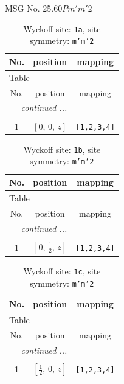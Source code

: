 \documentclass[fleqn,8pt]{jsarticle}
\begin{document}
\setcounter{MaxMatrixCols}{32}

\renewcommand{\tablename}{Table~}
\renewcommand{\figurename}{Figure~}
\begin{center}
\LARGE
MSG No. 25.60\quad$Pm'm'2$
\end{center}
\renewcommand{\arraystretch}{1.2}
\begin{longtable}{ccc}
\caption{Wyckoff site: {\tt 1a}, site symmetry: {\tt m'm'2}}
 \\
 \hline \hline
No. & position & mapping \\ \hline \endfirsthead

\multicolumn{2}{l}{\tablename\ \thetable{}} \\
 \hline \hline
No. & position & mapping \\ \hline \endhead

 \hline \hline
\multicolumn{2}{r}{\footnotesize\it continued ...} \\ \endfoot

 \hline \hline
\multicolumn{2}{r}{} \\ \endlastfoot

1 & $\left[ 0,\, 0,\, z \right]$ & {\tt [1,2,3,4]} \\
\end{longtable}
\renewcommand{\arraystretch}{1.2}
\begin{longtable}{ccc}
\caption{Wyckoff site: {\tt 1b}, site symmetry: {\tt m'm'2}}
 \\
 \hline \hline
No. & position & mapping \\ \hline \endfirsthead

\multicolumn{2}{l}{\tablename\ \thetable{}} \\
 \hline \hline
No. & position & mapping \\ \hline \endhead

 \hline \hline
\multicolumn{2}{r}{\footnotesize\it continued ...} \\ \endfoot

 \hline \hline
\multicolumn{2}{r}{} \\ \endlastfoot

1 & $\left[ 0,\, \frac{1}{2},\, z \right]$ & {\tt [1,2,3,4]} \\
\end{longtable}
\renewcommand{\arraystretch}{1.2}
\begin{longtable}{ccc}
\caption{Wyckoff site: {\tt 1c}, site symmetry: {\tt m'm'2}}
 \\
 \hline \hline
No. & position & mapping \\ \hline \endfirsthead

\multicolumn{2}{l}{\tablename\ \thetable{}} \\
 \hline \hline
No. & position & mapping \\ \hline \endhead

 \hline \hline
\multicolumn{2}{r}{\footnotesize\it continued ...} \\ \endfoot

 \hline \hline
\multicolumn{2}{r}{} \\ \endlastfoot

1 & $\left[ \frac{1}{2},\, 0,\, z \right]$ & {\tt [1,2,3,4]} \\
\end{longtable}
\end{document}
